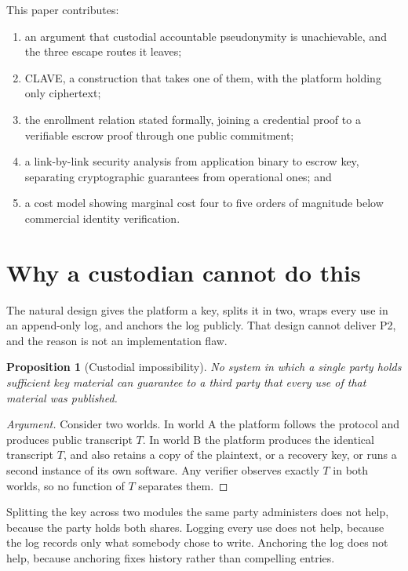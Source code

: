 \documentclass[11pt,a4paper]{article}
\newtheorem{proposition}{Proposition}
\begin{document}
This paper contributes:

\begin{enumerate}
  \item an argument that custodial accountable pseudonymity is unachievable, and
        the three escape routes it leaves;
  \item CLAVE, a construction that takes one of them, with the platform holding
        only ciphertext;
  \item the enrollment relation stated formally, joining a credential proof to a
        verifiable escrow proof through one public commitment;
  \item a link-by-link security analysis from application binary to escrow key,
        separating cryptographic guarantees from operational ones; and
  \item a cost model showing marginal cost four to five orders of magnitude
        below commercial identity verification.
\end{enumerate}

\section{Why a custodian cannot do this}
\label{sec:impossible}

The natural design gives the platform a key, splits it in two, wraps every use in
an append-only log, and anchors the log publicly. That design cannot deliver P2,
and the reason is not an implementation flaw.

\begin{proposition}[Custodial impossibility]
No system in which a single party holds sufficient key material can guarantee to
a third party that every use of that material was published.
\end{proposition}

\begin{proof}[Argument]
Consider two worlds. In world A the platform follows the protocol and produces
public transcript $T$. In world B the platform produces the identical transcript
$T$, and also retains a copy of the plaintext, or a recovery key, or runs a
second instance of its own software. Any verifier observes exactly $T$ in both
worlds, so no function of $T$ separates them.
\end{proof}

Splitting the key across two modules the same party administers does not help,
because the party holds both shares. Logging every use does not help, because
the log records only what somebody chose to write. Anchoring the log does not
help, because anchoring fixes history rather than compelling entries.
\end{document}
